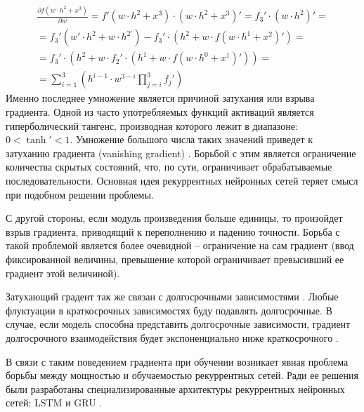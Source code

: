 \begin{gather*}
    \frac{\partial f\left(w\cdot h^{2} + x^{3}\right)}{\partial w} = f'\left(w\cdot h^{2}+ x^{3}\right)\cdot \left(w\cdot h^{2} + x^{3}\right)' = f_{3}'\cdot \left(w \cdot h^{2}\right)' = \\ = f_{3}'\left(w'\cdot h^{2} + w \cdot h^{2'}\right) - f_{3}'\cdot \left(h^{2} + w\cdot f\left(w \cdot h^{1} + x^{2}\right)'\right) = \\ = f_{3}'\cdot \left(h^{2}+ w\cdot f_{2}' \cdot \left(h^{1} + w\cdot f\left(w\cdot h^{0}+ x^{1}\right)'\right)\right) = \\ = \sum\limits_{i = 1}^{3} \left(h^{i-1} \cdot w^{3-i}\prod\limits_{j=i}^{3}f_{j}'\right)
\end{gather*}
Именно последнее умножение является причиной затухания или взрыва градиента. Одной из часто употребляемых функций активаций является гиперболический тангенс, производная которого лежит в диапазоне: $0 < \tanh' < 1$.
Умножение большого числа таких значений приведет к затуханию градиента (vanishing gradient) \cite{Zipser:1}. Борьбой с этим является ограничение количества скрытых состояний, что, по сути, ограничивает обрабатываемые последовательности. Основная идея рекуррентных нейронных сетей теряет смысл при подобном решении проблемы.

\bigskip\par
С другой стороны, если модуль произведения больше единицы, то произойдет взрыв градиента, приводящий к переполнению и падению точности. Борьба с такой проблемой является более очевидной -- ограничение на сам градиент (ввод фиксированной величины, превышение которой ограничивает превысивший ее градиент этой величиной). 

\bigskip\par
Затухающий градент так же связан с долгосрочными зависимостями \cite{Schmidhuber2001}. Любые флуктуации в краткосрочных зависимостях буду подавлять долгосрочные. В случае, если модель способна представить долгосрочные зависимости, градиент долгосрочного взаимодействия будет экспоненциально ниже краткосрочного \cite{Goodfellow}.

\bigskip\par
В связи с таким поведением градиента при обучении возникает явная проблема борьбы между мощностью и обучаемостью рекуррентных сетей. Ради ее решения были разработаны специализированные архитектуры рекуррентных нейронных сетей: LSTM \cite{Schmidhuber:1996} и GRU \cite{Sutskever:1}.

